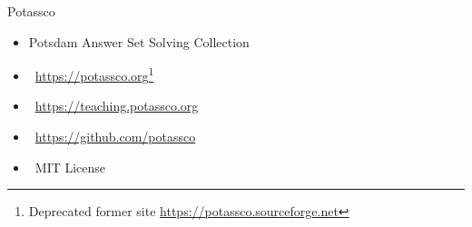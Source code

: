 \begin{frame}{Potassco}
  \bigskip
  \begin{itemize}
  \item Potsdam Answer Set Solving Collection
    \medskip
  \item {}     \ \url{https://potassco.org}\footnote{Deprecated former site \url{https://potassco.sourceforge.net}}
  \item {} \ \url{https://teaching.potassco.org}
  \item {}  \ \url{https://github.com/potassco}
  \item {}  \ MIT License
\end{itemize}
\end{frame}
%

